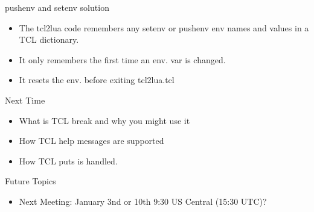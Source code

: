 \documentclass{beamer}
\begin{document}
\begin{frame}{pushenv and setenv solution}
  \begin{itemize}
    \item The tcl2lua code remembers any setenv or pushenv env names
      and values in a TCL dictionary.
    \item It only remembers the first time an env. var is changed.
    \item It resets the env. before exiting tcl2lua.tcl
  \end{itemize}
\end{frame}


\begin{frame}{Next Time}
  \begin{itemize}
    \item What is TCL break and why you might use it
    \item How TCL help messages are supported
    \item How TCL puts is handled.
  \end{itemize}
\end{frame}

\begin{frame}{Future Topics}
  \begin{itemize}
    \item Next Meeting: January 3nd or 10th 9:30 US Central (15:30 UTC)?
  \end{itemize}
\end{frame}
\end{document}
